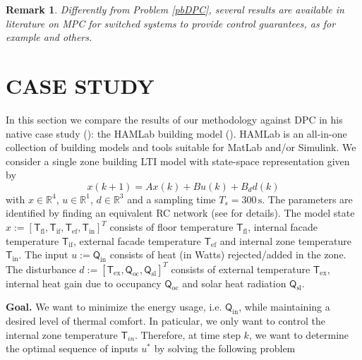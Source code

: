 \documentclass[letterpaper, 10 pt, conference]{ifacconf}  %
\newtheorem{remark}{Remark}
\begin{document}
\begin{remark}
	Differently from Problem \ref{pbDPC}, several results are available in literature on MPC for switched systems to provide control guarantees, as for example \cite{MullerJPC2012,BraatzAutomatica2016,OngTAC2016,DanielsonACC2016,DanielsonACC2017} and others.
\end{remark}


\section{CASE STUDY}\label{secCaseStudy}
In this section we compare the results of our methodology against DPC in his native case study (\cite{JainACC2017}): the HAMLab building model (\cite{VanSchijndel2005}). HAMLab is an all-in-one collection of building models and tools suitable for MatLab and/or Simulink. We consider a single zone building LTI model with state-space representation given by
\begin{equation}\label{eqHAMLabLTIModel}
x(k+1) = A x(k)+B u(k)+B_d d(k)
\end{equation}
with $x\in\mathbb{R}^4$, $u\in\mathbb{R}^1$, $d\in\mathbb{R}^3$ and a sampling time $T_s=300\,\mathrm{s}$. The parameters are identified by finding an equivalent RC network (see \cite{VanSchijndel2005} for details). The model state $x:=[\mathsf{T}_{\mathrm{fl}}, \mathsf{T}_{\mathrm{if}}, \mathsf{T}_{\mathrm{ef}}, \mathsf{T}_{\mathrm{in}}]^T$ consists of floor temperature $\mathsf{T}_{\mathrm{fl}}$, internal facade temperature $\mathsf{T}_{\mathrm{if}}$, external facade temperature $\mathsf{T}_{\mathrm{ef}}$ and internal zone temperature $\mathsf{T}_{\mathrm{in}}$. The input $u:=\mathsf{Q}_{\mathrm{in}}$ consists of heat (in Watts) rejected/added in the zone. The disturbance $d:=[\mathsf{T}_{\mathrm{ex}}, \mathsf{Q}_{\mathrm{oc}}, \mathsf{Q}_{\mathrm{sl}}]^T$ consists of external temperature $\mathsf{T}_{\mathrm{ex}}$, internal heat gain due to occupancy $\mathsf{Q}_{\mathrm{oc}}$ and solar heat radiation $\mathsf{Q}_{\mathrm{sl}}$.

\textbf{Goal.} We want to minimize the energy usage, i.e. $\mathsf{Q}_{\mathrm{in}}$, while maintaining a desired level of thermal comfort. In paticular, we only want to control the internal zone temperature $\mathsf{T}_{in}$. Therefore, at time step $k$, we want to determine the optimal sequence of inputs $u^*$ by solving the following problem
\end{document}
